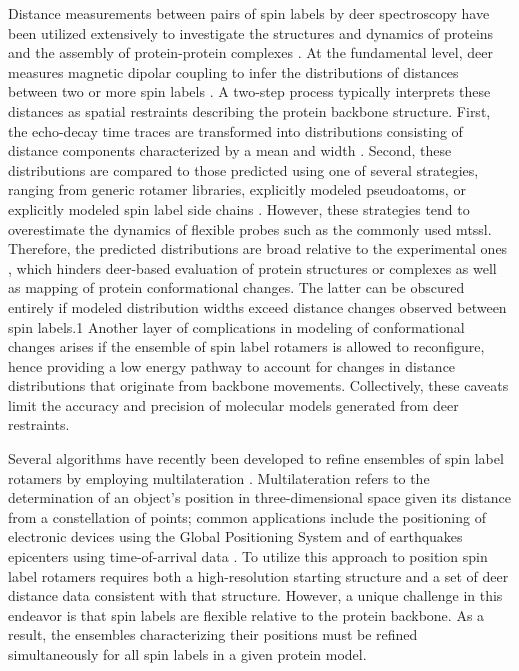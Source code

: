 Distance measurements between pairs of spin labels by \gls{deer} spectroscopy have been utilized extensively to investigate the structures and dynamics of proteins \citep*{Collauto2017, Evans2020, Kazmier2014, Mishra2014} and the assembly of protein-protein complexes \citep*{Bhatnagar2007, Kim2018, Kim2011, Tessmer2018}. At the fundamental level, \gls{deer} measures magnetic dipolar coupling to infer the distributions of distances between two or more spin labels \citep*{Jeschke2012, Mchaourab2011}. A two-step process typically interprets these distances as spatial restraints describing the protein backbone structure. First, the echo-decay time traces are transformed into distributions consisting of distance components characterized by a mean and width \citep*{FabregasIbanez2020, Hustedt2018, Jeschke2004, Pannier2000, Stein2015}. Second, these distributions are compared to those predicted using one of several strategies, ranging from generic rotamer libraries\citep*{Hagelueken2012, Polyhach2011, Reichel2018}, explicitly modeled pseudoatoms\citep*{Kazmier2014, Raghuraman2014}, or explicitly modeled spin label side chains \citep*{Alexander2013, Dastvan2016, Krug2016, Marinelli2019, Sale2005, Spicher2020}. However, these strategies tend to overestimate the dynamics of flexible probes such as the commonly used \gls{mtssl}. Therefore, the predicted distributions are broad relative to the experimental ones \citep*{Hagelueken2012, Hatmal2012, Islam2013, Jeschke2013, Klose2012}, which hinders \gls{deer}-based evaluation of protein structures or complexes as well as mapping of protein conformational changes. The latter can be obscured entirely if modeled distribution widths exceed distance changes observed between spin labels.1 Another layer of complications in modeling of conformational changes arises if the ensemble of spin label rotamers is allowed to reconfigure, hence providing a low energy pathway to account for changes in distance distributions that originate from backbone movements. Collectively, these caveats limit the accuracy and precision of molecular models generated from \gls{deer} restraints.

Several algorithms have recently been developed to refine ensembles of spin label rotamers by employing multilateration \citep*{Abdullin2015, Gaffney2012, Hagelueken2013, Hays2019, Jeschke2018, Reichel2018}. Multilateration refers to the determination of an object’s position in three-dimensional space given its distance from a constellation of points; common applications include the positioning of electronic devices using the Global Positioning System and of earthquakes epicenters using time-of-arrival data \citep*{Fang1986}.  To utilize this approach to position spin label rotamers requires both a high-resolution starting structure and a set of \gls{deer} distance data consistent with that structure. However, a unique challenge in this endeavor is that spin labels are flexible relative to the protein backbone.  As a result, the ensembles characterizing their positions must be refined simultaneously for all spin labels in a given protein model. 

